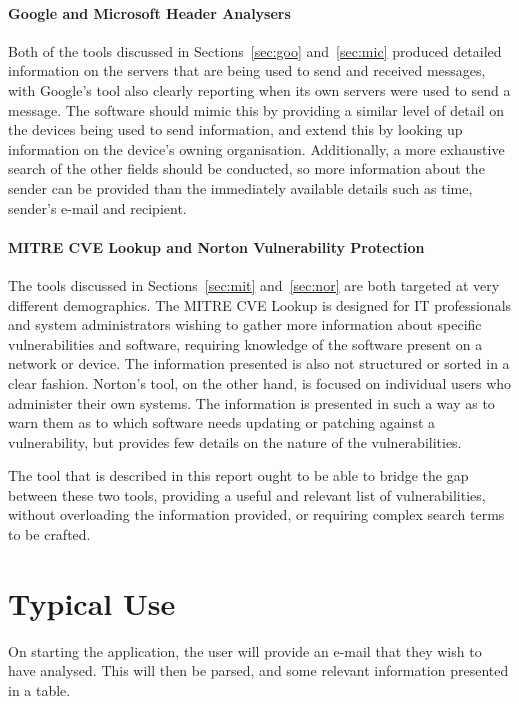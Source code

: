 \paragraph{Google and Microsoft Header Analysers} Both of the tools discussed
in Sections~\ref{sec:goo} and~\ref{sec:mic} produced detailed information on
the servers that are being used to send and received messages, with Google's
tool also clearly reporting when its own servers were used to send a message.
The software should mimic this by providing a similar level of detail on the
devices being used to send information, and extend this by looking up
information on the device's owning organisation.  Additionally, a more
exhaustive search of the other fields should be conducted, so more information
about the sender can be provided than the immediately available details such as
time, sender's e-mail and recipient.

\paragraph{MITRE CVE Lookup and Norton Vulnerability Protection} The tools
discussed in Sections~\ref{sec:mit} and~\ref{sec:nor} are both targeted at very
different demographics.  The MITRE CVE Lookup is designed for IT professionals
and system administrators wishing to gather more information about specific
vulnerabilities and software, requiring knowledge of the software present on a
network or device.  The information presented is also not structured or sorted
in a clear fashion.  Norton's tool, on the other hand, is focused on individual
users who administer their own systems.  The information is presented in such a
way as to warn them as to which software needs updating or patching against a
vulnerability, but provides few details on the nature of the vulnerabilities.

The tool that is described in this report ought to be able to bridge the gap
between these two tools, providing a useful and relevant list of
vulnerabilities, without overloading the information provided, or requiring
complex search terms to be crafted. 

\section{Typical Use}
On starting the application, the user will provide an e-mail that they wish
to have analysed.  This will then be parsed, and some relevant information
presented in a table.

